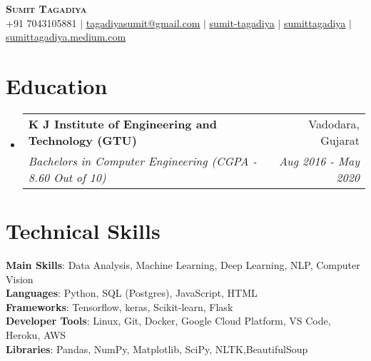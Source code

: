 \documentclass[letterpaper,11pt]{article}
\makeatletter
\newcommand{\resumeSubheading}[4]{
  \vspace{-2pt}\item
    \begin{tabular*}{0.97\textwidth}[t]{l@{\extracolsep{\fill}}r}
      \textbf{#1} & #2 \\
      \textit{\small#3} & \textit{\small #4} \\
    \end{tabular*}\vspace{-7pt}
}
\newcommand{\resumeSubHeadingListStart}{\begin{itemize}[leftmargin=0.15in, label={}]}
\newcommand{\resumeSubHeadingListEnd}{\end{itemize}}
\makeatother
\begin{document}

\begin{center}
    \textbf{\Huge \scshape Sumit Tagadiya} \\ \vspace{1pt}
    \small +91 7043105881 $|$
    \href{mailto:tagadiyasumit@gmail.com}{\underline{tagadiyasumit@gmail.com}} $|$ 
    \faLinkedinSquare \space
    \href{https://www.linkedin.com/in/sumittagadiya/}{\underline{sumit-tagadiya}} $|$
    \faGithub \space
    \href{https://github.com/sumittagadiya}{\underline{sumittagadiya}} $|$
    \href{https://sumittagadiya.medium.com/}{\underline{sumittagadiya.medium.com}}
    
\end{center}


\section{Education}
  \resumeSubHeadingListStart
    \resumeSubheading
      {K J Institute of Engineering and Technology (GTU)}{Vadodara, Gujarat}
      {Bachelors in Computer Engineering (CGPA - 8.60 Out of 10)}{Aug 2016 - May 2020}
  \resumeSubHeadingListEnd


\section{Technical Skills}
 \begin{itemize}[leftmargin=0.15in, label={}]
    \small{\item{
     \textbf{Main Skills}{: Data Analysis, Machine Learning, Deep Learning, NLP, Computer Vision} \\
     \textbf{Languages}{: Python, SQL (Postgres), JavaScript, HTML} \\
     \textbf{Frameworks}{: Tensorflow, keras, Scikit-learn, Flask} \\
     \textbf{Developer Tools}{: Linux, Git, Docker, Google Cloud Platform, VS Code, Heroku, AWS} \\
     \textbf{Libraries}{: Pandas, NumPy, Matplotlib, SciPy, NLTK,BeautifulSoup}
    }}
 \end{itemize}
      
\end{document}
